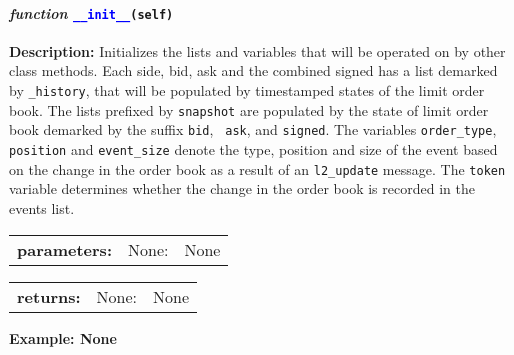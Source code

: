 \paragraph{\textit{function} \textcolor{blue}{\texttt{\_\_init\_\_}}\texttt{(self)}}\hfill\break
\textbf{Description:} Initializes the lists and variables that will be operated on by other class methods. Each side, bid, ask and the combined signed has a list demarked by \texttt{\_history}, that will be populated by timestamped states of the limit order book. The lists prefixed by \texttt{snapshot} are populated by the state of limit order book demarked by the suffix \texttt{bid}, \texttt{ ask}, and \texttt{signed}. The variables \texttt{order\_type},  \texttt{position} and \texttt{event\_size} denote the type, position and size of the event based on the change in the order book as a result of an \texttt{l2\_update} message. The \texttt{token} variable determines whether the change in the order book is recorded in the events list. 
%

\begin{tabular}{r r l }
	\textbf{parameters:}	& None: & None\\
\end{tabular}

\begin{tabular}{r r l}
	\textbf{returns:} & None: & None\\
\end{tabular}

\textbf{Example: None}